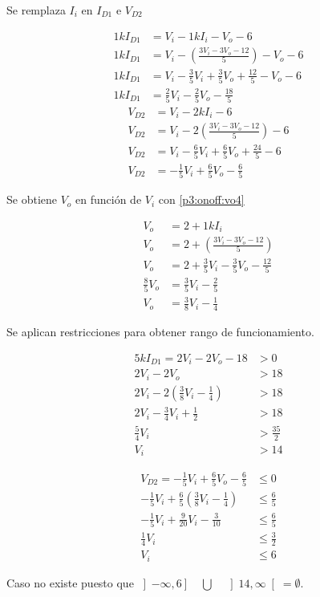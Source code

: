 Se remplaza $I_i$ en $I_{D1}$ e $V_{D2}$

\begin{align*}
  1k I_{D1} &= V_i - 1k I_i - V_o - 6
  \\
  1k I_{D1} &= V_i - \left(\frac{3 V_i - 3 V_o - 12}{5}\right) - V_o - 6
  \\
  1k I_{D1} &= V_i - \frac{3}{5} V_i + \frac{3}{5} V_o + \frac{12}{5} - V_o - 6
  \\
  1k I_{D1} &= \frac{2}{5} V_i - \frac{2}{5} V_o - \frac{18}{5}
\end{align*}
\begin{align*}
  V_{D2} &= V_i - 2k I_i - 6
  \\
  V_{D2} &= V_i - 2 \left(\frac{3 V_i - 3 V_o - 12}{5}\right) - 6
  \\
  V_{D2} &= V_i - \frac{6}{5} V_i + \frac{6}{5} V_o + \frac{24}{5} - 6
  \\
  V_{D2} &= - \frac{1}{5} V_i + \frac{6}{5} V_o - \frac{6}{5}
\end{align*}

Se obtiene $V_o$ en función de $V_i$ con \ref{p3:onoff:vo4}

\begin{align*}
  V_o &= 2 + 1k I_i
  \\
  V_o &= 2 + \left(\frac{3 V_i - 3 V_o - 12}{5}\right)
  \\
  V_o &= 2 + \frac{3}{5} V_i - \frac{3}{5} V_o - \frac{12}{5}
  \\
  \frac{8}{5} V_o &= \frac{3}{5} V_i - \frac{2}{5}
  \\
  V_o &= \frac{3}{8} V_i - \frac{1}{4}
\end{align*}

Se aplican restricciones para obtener rango de funcionamiento.

\begin{align*}
  5k I_{D1} = 2 V_i - 2 V_o - 18 &> 0
  \\
  2 V_i - 2 V_o &> 18
  \\
  2 V_i - 2 \left(\frac{3}{8} V_i - \frac{1}{4}\right) &> 18
  \\
  2 V_i - \frac{3}{4} V_i + \frac{1}{2} &> 18
  \\
  \frac{5}{4} V_i &> \frac{35}{2}
  \\
  V_i &> 14
\end{align*}

\begin{align*}
  V_{D2} = - \frac{1}{5} V_i + \frac{6}{5} V_o - \frac{6}{5} &\leq 0
  \\
  - \frac{1}{5} V_i + \frac{6}{5} \left(\frac{3}{8} V_i - \frac{1}{4}\right) &\leq \frac{6}{5}
  \\
  - \frac{1}{5} V_i + \frac{9}{20} V_i - \frac{3}{10} &\leq \frac{6}{5}
  \\
  \frac{1}{4} V_i &\leq \frac{3}{2}
  \\
  V_i &\leq 6
\end{align*}


Caso no existe puesto que $\left]-\infty, 6\right] \quad \bigcup \quad \left]14, \infty\right[ = \emptyset$.
